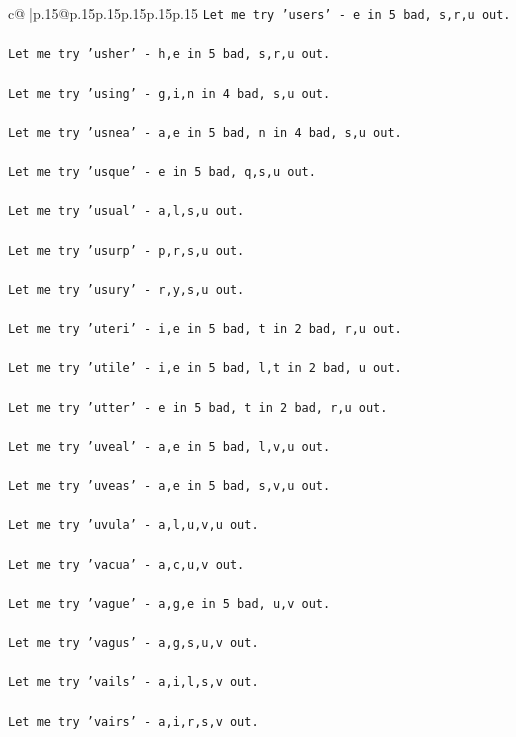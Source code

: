 \documentclass{article}
\begin{document}
{\begin{supertabular}{c@{$\;$}|p{.15\linewidth}@{}p{.15\linewidth}p{.15\linewidth}p{.15\linewidth}p{.15\linewidth}p{.15\linewidth}}
{{{\texttt{Let me try 'users' {-} e in 5 bad, s,r,u out. } \\
\\ 
\texttt{Let me try 'usher' {-} h,e in 5 bad, s,r,u out. } \\
\\ 
\texttt{Let me try 'using' {-} g,i,n in 4 bad, s,u out. } \\
\\ 
\texttt{Let me try 'usnea' {-} a,e in 5 bad, n in 4 bad, s,u out. } \\
\\ 
\texttt{Let me try 'usque' {-} e in 5 bad, q,s,u out. } \\
\\ 
\texttt{Let me try 'usual' {-} a,l,s,u out. } \\
\\ 
\texttt{Let me try 'usurp' {-} p,r,s,u out. } \\
\\ 
\texttt{Let me try 'usury' {-} r,y,s,u out. } \\
\\ 
\texttt{Let me try 'uteri' {-} i,e in 5 bad, t in 2 bad, r,u out. } \\
\\ 
\texttt{Let me try 'utile' {-} i,e in 5 bad, l,t in 2 bad, u out. } \\
\\ 
\texttt{Let me try 'utter' {-} e in 5 bad, t in 2 bad, r,u out. } \\
\\ 
\texttt{Let me try 'uveal' {-} a,e in 5 bad, l,v,u out. } \\
\\ 
\texttt{Let me try 'uveas' {-} a,e in 5 bad, s,v,u out. } \\
\\ 
\texttt{Let me try 'uvula' {-} a,l,u,v,u out. } \\
\\ 
\texttt{Let me try 'vacua' {-} a,c,u,v out. } \\
\\ 
\texttt{Let me try 'vague' {-} a,g,e in 5 bad, u,v out. } \\
\\ 
\texttt{Let me try 'vagus' {-} a,g,s,u,v out. } \\
\\ 
\texttt{Let me try 'vails' {-} a,i,l,s,v out. } \\
\\ 
\texttt{Let me try 'vairs' {-} a,i,r,s,v out. } \\
}}}
\end{supertabular}}
\end{document}
